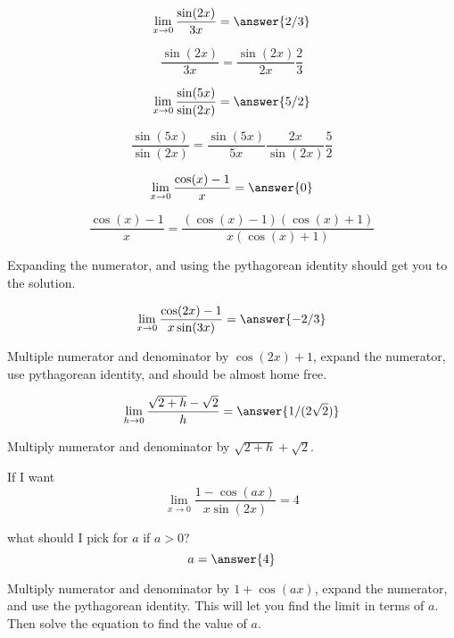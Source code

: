 \documentclass[handout]{ximera}
\begin{document}
\begin{exercise}
\[\lim_{x \to 0} \frac{\sin(2x)}{3x} = \answer{2/3}\]
\begin{hint}
	\[\frac{\sin(2x)}{3x} = \frac{\sin(2x)}{2x} \frac{2}{3}\]
\end{hint}
\end{exercise}

\begin{exercise}
\[\lim_{x \to 0} \frac{\sin(5x)}{\sin(2x)} = \answer{5/2}\]
\begin{hint}
	\[ \frac{\sin(5x)}{\sin(2x)} = \frac{\sin(5x)}{5x} \frac{2x}{\sin(2x)} \frac{5}{2}\]
\end{hint}
\end{exercise}

\begin{exercise}
\[\lim_{x \to 0} \frac{\cos(x)-1}{x} = \answer{0}\]
\begin{hint}
	\[\frac{\cos(x)-1}{x} = \frac{(\cos(x)-1)(\cos(x)+1)}{x(\cos(x)+1)}\]
\end{hint}
\begin{hint}
	Expanding the numerator, and using the pythagorean identity should get you to the solution.
\end{hint}
\end{exercise}

\begin{exercise}
\[\lim_{x \to 0} \frac{\cos(2x)-1}{x\sin(3x)} = \answer{-2/3}\]
\begin{hint}
	Multiple numerator and denominator by $\cos(2x)+1$, expand the numerator, use pythagorean identity, and should be almost home free.
\end{hint}
\end{exercise}

\begin{exercise}
	\[\lim_{h \to 0} \frac{\sqrt{2+h} - \sqrt{2}}{h} = \answer{1/(2\sqrt{2})}\]
	\begin{hint}
		Multiply numerator and denominator by $\sqrt{2+h}+\sqrt{2}$.
	\end{hint}
\end{exercise}

\begin{exercise}
If I want 
\[
\displaystyle\lim_{x \to 0} \frac{1-\cos(ax)}{x\sin(2x)} = 4
\]

what should I pick for $a$ if $a>0$?
	\[a = \answer{4}\]
	\begin{hint}
		Multiply numerator and denominator by $1+\cos(ax)$, expand the numerator, and use the pythagorean identity.  This will let you find the limit in terms of $a$.  Then solve the equation to find the value of $a$.
	\end{hint}
\end{exercise}
\end{document}
